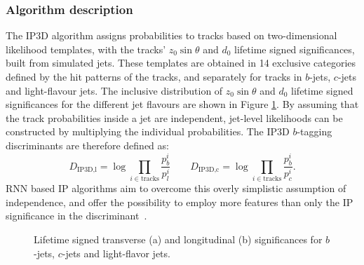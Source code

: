 \subsubsection{Algorithm description}



The IP3D algorithm \cite{FTAG-2018-01} assigns probabilities to tracks based on two-dimensional likelihood templates, with the tracks' $z_0\sin\theta$ and $d_0$ lifetime signed significances, built from simulated jets.
These templates are obtained in 14 exclusive categories defined by the hit patterns of the tracks, and separately for tracks in $b$-jets, $c$-jets and light-flavour jets. 
The inclusive distribution of $z_0\sin\theta$ and $d_0$ lifetime signed significances for the different jet flavours are shown in Figure \ref{fig:flippedInputs}.
By assuming that the track probabilities inside a jet are independent, jet-level likelihoods can be constructed by multiplying the individual probabilities.
The IP3D $b$-tagging discriminants are therefore defined as:
\begin{equation}
D_{\text{IP3D,l}} = \log \prod_{i \in \text{tracks}} \frac{p_b^i}{p_l^{i}} \qquad D_{\text{IP3D,c}} = \log \prod_{i \in \text{tracks}} \frac{p_b^i}{p_c^{i}}.
\end{equation}
RNN based IP algorithms aim to overcome this overly simplistic assumption of independence, and offer the possibility to employ more features than only the IP significance in the discriminant~\cite{ATL-PHYS-PUB-2017-003}. 

\def\figpath{figures/ftag/dips-note/}
\begin{figure}[htbp]
  \centering
  \caption{Lifetime signed transverse (a) and longitudinal (b) significances for $b$-jets, $c$-jets and light-flavor jets.}
  \label{fig:flippedInputs}
\end{figure}


